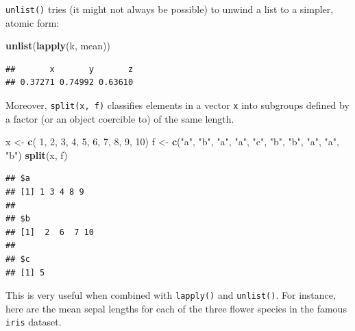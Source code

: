 \documentclass[10pt,b5paper,krantz1]{krantz}
\newenvironment{Shaded}{\begin{snugshade}}{\end{snugshade}}
\newcommand{\DecValTok}[1]{\textcolor[rgb]{0.06,0.06,0.06}{#1}}
\newcommand{\KeywordTok}[1]{\textcolor[rgb]{0.27,0.27,0.27}{\textbf{#1}}}
\newcommand{\NormalTok}[1]{#1}
\newcommand{\OperatorTok}[1]{\textcolor[rgb]{0.43,0.43,0.43}{\textbf{#1}}}
\newcommand{\StringTok}[1]{\textcolor[rgb]{0.5,0.5,0.5}{#1}}
\begin{document}
\texttt{unlist()} tries (it might not always be possible)
to unwind a list to a simpler, atomic form:

\begin{Shaded}
\begin{Highlighting}[]
\KeywordTok{unlist}\NormalTok{(}\KeywordTok{lapply}\NormalTok{(k, mean))}
\end{Highlighting}
\end{Shaded}

\begin{verbatim}
##       x       y       z 
## 0.37271 0.74992 0.63610
\end{verbatim}

Moreover, \texttt{split(x,\ f)} classifies elements in a vector \texttt{x}
into subgroups defined by a factor (or an object coercible to)
of the same length.

\begin{Shaded}
\begin{Highlighting}[]
\NormalTok{x <-}\StringTok{ }\KeywordTok{c}\NormalTok{(  }\DecValTok{1}\NormalTok{,   }\DecValTok{2}\NormalTok{,   }\DecValTok{3}\NormalTok{,   }\DecValTok{4}\NormalTok{,   }\DecValTok{5}\NormalTok{,   }\DecValTok{6}\NormalTok{,   }\DecValTok{7}\NormalTok{,   }\DecValTok{8}\NormalTok{,   }\DecValTok{9}\NormalTok{,  }\DecValTok{10}\NormalTok{)}
\NormalTok{f <-}\StringTok{ }\KeywordTok{c}\NormalTok{(}\StringTok{"a"}\NormalTok{, }\StringTok{"b"}\NormalTok{, }\StringTok{"a"}\NormalTok{, }\StringTok{"a"}\NormalTok{, }\StringTok{"c"}\NormalTok{, }\StringTok{"b"}\NormalTok{, }\StringTok{"b"}\NormalTok{, }\StringTok{"a"}\NormalTok{, }\StringTok{"a"}\NormalTok{, }\StringTok{"b"}\NormalTok{)}
\KeywordTok{split}\NormalTok{(x, f)}
\end{Highlighting}
\end{Shaded}

\begin{verbatim}
## $a
## [1] 1 3 4 8 9
## 
## $b
## [1]  2  6  7 10
## 
## $c
## [1] 5
\end{verbatim}

This is very useful when combined with \texttt{lapply()} and \texttt{unlist()}.
For instance, here are the mean sepal lengths
for each of the three flower species in the famous \texttt{iris} dataset.

\begin{Shaded}
\end{Shaded}
\end{document}
